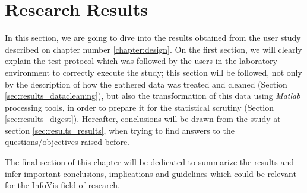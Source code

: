 
\chapter{Research Results}
\label{chapter:results}
%
In this section, we are going to dive into the results obtained from the user study described on chapter number \ref{chapter:design}.
On the first section, we will clearly explain the test protocol which was followed by the users in the laboratory environment to correctly
execute the study; this section will be followed, not only by the description of how the gathered data was treated and cleaned
(Section \ref{sec:results_datacleaning}), but also the transformation of this data using \emph{Matlab} processing tools, in order to prepare
it for the statistical scrutiny (Section \ref{sec:results_digest}). Hereafter, conclusions will be drawn from the study at section
\ref{sec:results_results}, when trying to find answers to the questions/objectives raised before. \par
%
The final section of this chapter will be dedicated to summarize the results and infer important conclusions, implications and guidelines which
could be relevant for the InfoVis field of research.
%
